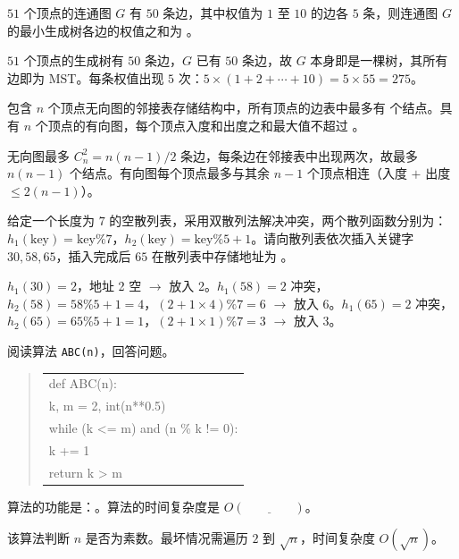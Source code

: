 \begin{question}
$51$ 个顶点的连通图 $G$ 有 $50$ 条边，其中权值为 $1$ 至 $10$ 的边各 $5$ 条，则连通图 $G$ 的最小生成树各边的权值之和为 \underline{\hspace{4em}}。
\begin{solution}
$51$ 个顶点的生成树有 $50$ 条边，$G$ 已有 $50$ 条边，故 $G$ 本身即是一棵树，其所有边即为 MST。每条权值出现 $5$ 次：$5\times(1+2+\cdots+10)=5\times55=275$。
\end{solution}
\end{question}

\begin{question}
包含 $n$ 个顶点无向图的邻接表存储结构中，所有顶点的边表中最多有 \underline{\hspace{4em}} 个结点。具有 $n$ 个顶点的有向图，每个顶点入度和出度之和最大值不超过 \underline{\hspace{4em}}。
\begin{solution}
无向图最多 $C_n^2=n(n-1)/2$ 条边，每条边在邻接表中出现两次，故最多 $n(n-1)$ 个结点。有向图每个顶点最多与其余 $n-1$ 个顶点相连（入度 $+$ 出度 $\le 2(n-1)$）。
\end{solution}
\end{question}

\begin{question}
给定一个长度为 $7$ 的空散列表，采用双散列法解决冲突，两个散列函数分别为：$h_1(\text{key})=\text{key}\%7$，$h_2(\text{key})=\text{key}\%5+1$。请向散列表依次插入关键字 $30,58,65$，插入完成后 $65$ 在散列表中存储地址为 \underline{\hspace{4em}}。
\begin{solution}
$h_1(30)=2$，地址 2 空 $\to$ 放入 2。$h_1(58)=2$ 冲突，$h_2(58)=58\%5+1=4$，$(2+1\times4)\%7=6$ $\to$ 放入 6。$h_1(65)=2$ 冲突，$h_2(65)=65\%5+1=1$，$(2+1\times1)\%7=3$ $\to$ 放入 3。
\end{solution}
\end{question}

\begin{question}
阅读算法 \texttt{ABC(n)}，回答问题。
\begin{quote}
\footnotesize
\begin{tabular}{@{}l@{}}
def ABC(n):\\
    k, m = 2, int(n**0.5)\\
    while (k <= m) and (n \% k != 0):\\
        k += 1\\
    return k > m\\
\end{tabular}
\end{quote}
算法的功能是：\underline{\hspace{4em}}。算法的时间复杂度是 $O(\underline{\hspace{4em}})$。
\begin{solution}
该算法判断 $n$ 是否为素数。最坏情况需遍历 $2$ 到 $\sqrt{n}$，时间复杂度 $O(\sqrt{n})$。
\end{solution}
\end{question}

